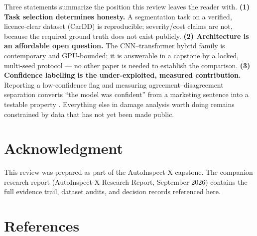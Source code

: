 \documentclass[conference]{IEEEtran}
\begin{document}
Three statements summarize the position this review leaves the reader with.
\textbf{(1) Task selection determines honesty.} A segmentation task on a
verified, licence-clear dataset (CarDD) is reproducible; severity/cost claims
are not, because the required ground truth does not exist publicly.
\textbf{(2) Architecture is an affordable open question.} The CNN--transformer
hybrid family is contemporary and GPU-bounded; it is answerable in a capstone by
a locked, multi-seed protocol --- no other paper is needed to establish the
comparison. \textbf{(3) Confidence labelling is the under-exploited, measured
contribution.} Reporting a low-confidence flag and measuring
agreement--disagreement separation converts ``the model was confident'' from a
marketing sentence into a testable property \cite{kendall2017}. Everything else
in damage analysis worth doing remains constrained by data that has not yet been
made public.

\section*{Acknowledgment}
This review was prepared as part of the AutoInspect-X capstone. The companion
research report (AutoInspect-X Research Report, September 2026) contains the
full evidence trail, dataset audits, and decision records referenced here.

\section*{References}


\end{document}

